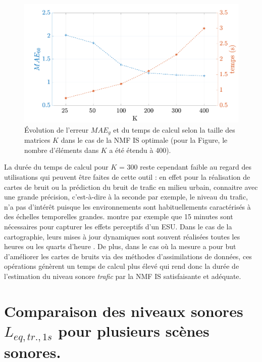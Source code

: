 \begin{figure}
\centering
\includegraphics[width=.7\linewidth]{./figures/resultats/timeErrorNMF_IS_K.pdf}
\caption{Évolution de l'erreur $MAE_g$ et du temps de calcul selon la taille des matrices $K$ dans le cas de la NMF IS optimale (pour la Figure, le nombre d'éléments dans $K$ a été étendu à 400).} 
\label{fig:errorTime}
\end{figure}

La durée du temps de calcul pour $K$ = 300 reste cependant faible au regard des utilisations qui peuvent être faites de cette outil : en effet pour la réalisation de cartes de bruit ou la prédiction du bruit de trafic en milieu urbain, connaitre avec une grande précision, c'est-à-dire à la seconde par exemple, le niveau du trafic, n'a pas d'intérêt puisque les environnements sont habituellements caractérisés à des échelles temporelles grandes. \cite{brocolini2013measurements} montre par exemple que 15 minutes sont nécessaires pour capturer les effets perceptifs d'un ESU. Dans le cas de la cartographie, leurs mises à jour dynamiques sont souvent réalisées toutes les heures \cite{bellucci_life_2017} ou les quarts d'heure \cite{wei_dynamic_2016}. De plus, dans le cas où la mesure a pour but d'améliorer les cartes de bruits via des méthodes d'assimilations de données, ces opérations génèrent un temps de calcul plus élevé qui rend donc la durée de l'estimation du niveau sonore \textit{trafic} par la NMF IS satisfaisante et adéquate.

\section{Comparaison des niveaux sonores $L_{eq,tr.,1s}$ pour plusieurs scènes sonores.}

